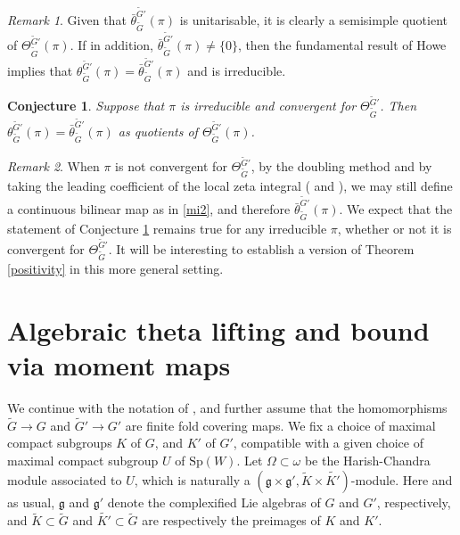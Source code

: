 \documentclass[lang = american]{ems-icm} %
\def\Sp{{\mathrm{Sp}}}
\newcommand{\g}{\mathfrak g}
\numberwithin{equation}{section}
\newtheorem{conj}[thm]{Conjecture}
\theoremstyle{remark}
\newtheorem*{remark}{Remark}
\begin{document}
\begin{remark} Given that $\bar \theta_{\widetilde G}^{\widetilde G'}(\pi)$ is unitarisable, it is clearly a semisimple quotient of $\Theta_{\widetilde G}^{\widetilde G'}(\pi)$. If in addition,
$\bar \theta_{\widetilde G}^{\widetilde G'}(\pi)\neq \{0\}$, then the fundamental result of Howe implies that $\theta_{\widetilde G}^{\widetilde G'}(\pi)=\bar \theta_{\widetilde G}^{\widetilde G'}(\pi)$ and is irreducible.
\end{remark}




\begin{conj}\label{conj1}
Suppose that  $\pi$ is irreducible and convergent for $\Theta_{\widetilde G}^{\widetilde G'}$. Then  $\theta_{\widetilde G}^{\widetilde G'}(\pi)=\bar \theta_{\widetilde G}^{\widetilde G'}(\pi)$ as quotients of $\Theta_{\widetilde G}^{\widetilde G'}(\pi)$.
\end{conj}


\begin{remark} When $\pi$ is not convergent for $\Theta_{\widetilde G}^{\widetilde G'}$, by the doubling method and by taking the leading coefficient of the local zeta integral (\cite{PsR} and \cite[Section 3]{LR}), we may still define a continuous bilinear map as in \eqref{mi2}, and therefore $\bar \theta_{\widetilde G}^{\widetilde G'}(\pi)$. We expect that the statement of Conjecture \ref{conj1} remains true for any irreducible $\pi$, whether or not it is  convergent for $\Theta_{\widetilde G}^{\widetilde G'}$. It will be interesting to establish a version of Theorem \ref{positivity} in this more general setting.
\end{remark}



\section{Algebraic theta lifting and bound via moment maps}\label{sec3}

We continue with the notation of , and further assume that the homomorphisms $\widetilde G\rightarrow G$ and $\widetilde G'\rightarrow G'$ are finite fold covering maps.  We fix a choice of maximal compact subgroups $K$ of $G$, and $K'$ of $G'$, compatible with a given choice of maximal compact subgroup $U$ of $\Sp(W)$. Let $\Omega \subset \omega$ be the Harish-Chandra module associated to $U$,  which is
naturally  a $(\g\times \g', \widetilde{K}\times \widetilde{K'})$-module. Here and as usual, $\g$ and $\g'$ denote the complexified Lie algebras of $G$ and $G'$, respectively, and $\widetilde {K}\subset \widetilde G$ and $\widetilde{K'}\subset \widetilde G$ are respectively the preimages of $K$ and $K'$.
\end{document}
